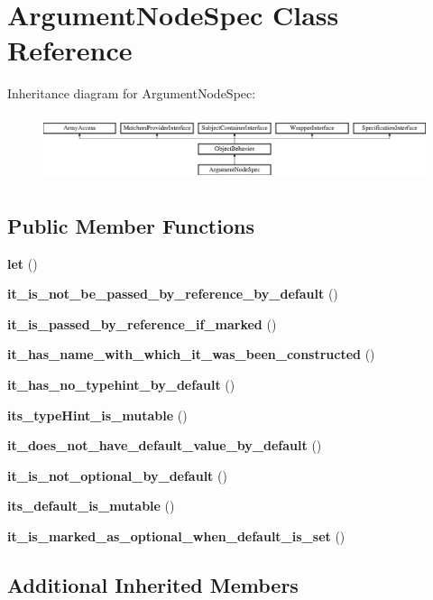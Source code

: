 \section{Argument\+Node\+Spec Class Reference}
\label{classspec_1_1_prophecy_1_1_doubler_1_1_generator_1_1_node_1_1_argument_node_spec}
Inheritance diagram for Argument\+Node\+Spec\+:\begin{figure}[H]
\begin{center}
\leavevmode
\includegraphics[height=1.953488cm]{classspec_1_1_prophecy_1_1_doubler_1_1_generator_1_1_node_1_1_argument_node_spec}
\end{center}
\end{figure}
\subsection*{Public Member Functions}
\begin{DoxyCompactItemize}
\item 
{\bf let} ()
\item 
{\bf it\+\_\+is\+\_\+not\+\_\+be\+\_\+passed\+\_\+by\+\_\+reference\+\_\+by\+\_\+default} ()
\item 
{\bf it\+\_\+is\+\_\+passed\+\_\+by\+\_\+reference\+\_\+if\+\_\+marked} ()
\item 
{\bf it\+\_\+has\+\_\+name\+\_\+with\+\_\+which\+\_\+it\+\_\+was\+\_\+been\+\_\+constructed} ()
\item 
{\bf it\+\_\+has\+\_\+no\+\_\+typehint\+\_\+by\+\_\+default} ()
\item 
{\bf its\+\_\+type\+Hint\+\_\+is\+\_\+mutable} ()
\item 
{\bf it\+\_\+does\+\_\+not\+\_\+have\+\_\+default\+\_\+value\+\_\+by\+\_\+default} ()
\item 
{\bf it\+\_\+is\+\_\+not\+\_\+optional\+\_\+by\+\_\+default} ()
\item 
{\bf its\+\_\+default\+\_\+is\+\_\+mutable} ()
\item 
{\bf it\+\_\+is\+\_\+marked\+\_\+as\+\_\+optional\+\_\+when\+\_\+default\+\_\+is\+\_\+set} ()
\end{DoxyCompactItemize}
\subsection*{Additional Inherited Members}


